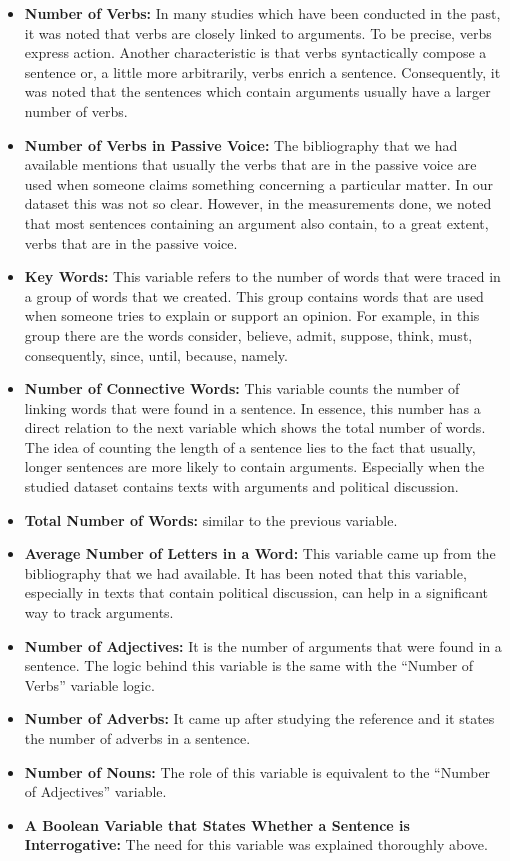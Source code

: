 \begin{itemize}

	\item \textbf{Number of Verbs:} In many studies which have been conducted in the past, it was noted that verbs are closely linked to arguments. To be precise, verbs express action. Another characteristic is that verbs syntactically compose a sentence or, a little more arbitrarily, verbs enrich a sentence. Consequently, it was noted that the sentences which contain arguments usually have a larger number of verbs.
	\item \textbf{Number of Verbs in Passive Voice:} The bibliography that we had available mentions that usually the verbs that are in the passive voice are used when someone claims something concerning a particular matter. In our dataset this was not so clear. However, in the measurements done, we noted that most sentences containing an argument also contain, to a great extent, verbs that are in the passive voice.
	\item \textbf{Key Words:} This variable refers to the number of words that were traced in a group of words that we created. This group contains words that are used when someone tries to explain or support an opinion. For example, in this group there are the words  consider, believe, admit, suppose, think, must, consequently, since, until, because, namely.
	\item \textbf{Number of Connective Words:} This variable counts the number of linking words that were found in a sentence. In essence, this number has a direct relation to the next variable which shows the total number of words. The idea of counting the length of a sentence lies to the fact that usually, longer sentences are more likely to contain arguments. Especially when the studied dataset contains texts with arguments and political discussion.
	\item \textbf{Total Number of Words:} similar to the previous variable.
	\item \textbf{Average Number of Letters in a Word:} This variable came up from the bibliography that we had available. It has been noted that this variable, especially in texts that contain political discussion, can help in a significant way to track arguments.
	\item \textbf{Number of Adjectives:} It is the number of arguments that were found in a sentence. The logic behind this variable is the same  with  the ``Number of Verbs'' variable logic.
	\item \textbf{Number of Adverbs:} It came up after studying the reference and it states the number of adverbs in a sentence.
	\item \textbf{Number of Nouns:} The role of this variable is equivalent to the ``Number of Adjectives'' variable.
	\item \textbf{A Boolean Variable that States Whether a Sentence is Interrogative:} The need for this variable was explained thoroughly above.

\end{itemize}

